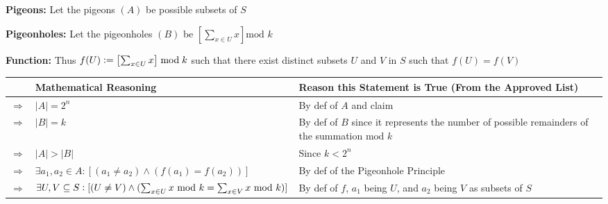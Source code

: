\documentclass{article}
\begin{document}
\textbf{Pigeons:} Let the pigeons $(A)$ be possible subsets of $S$\vspace{2pt}

\textbf{Pigeonholes:} Let the pigeonholes $(B)$ be $\left[\sum_{x\in U}^{}x\right]\text{mod } k$

\textbf{Function:} Thus $f(U)\vcentcolon=\left[\sum_{x\in U}x\right]\bmod k$ such that there exist distinct subsets $U$ and $V$ in $S$ such that $f(U)=f(V)$


\begin{flushleft}
    \begin{tabular}{|p{0.5cm}|p{5.6cm}|p{6cm}|}
        \hline
        & \textbf{Mathematical Reasoning} & \textbf{Reason this Statement is True (From the Approved List)} \\
        \hline
        $\Rightarrow$ & $|A|=2^n$ & By def of \(A\) and claim \\
        \hline
        $\Rightarrow$ & $|B|=k$ & By def of \(B\) since it represents the number of possible remainders of the summation \(\text{mod } k\) \\
        \hline
        $\Rightarrow$ & $|A|>|B|$ & Since \(k<2^n\) \\
        \hline
        $\Rightarrow$ & $\exists a_1,a_2\in A\colon [(a_1\neq a_2)\land (f(a_1)=f(a_2))]$ & By def of the Pigeonhole Principle \\
        \hline
        $\Rightarrow$ & $\exists U, V\subseteq S\vcentcolon[(U\neq V)\land(\sum_{x\in U}^{}x\text{ mod } k = \sum_{x\in V}^{}x\text{ mod } k)]$ & By def of \(f\), \(a_1\) being $U$, and \(a_2\) being $V$ as subsets of \(S\) \\
        \hline
    \end{tabular}
\end{flushleft}\vspace{20pt}
\end{document}
